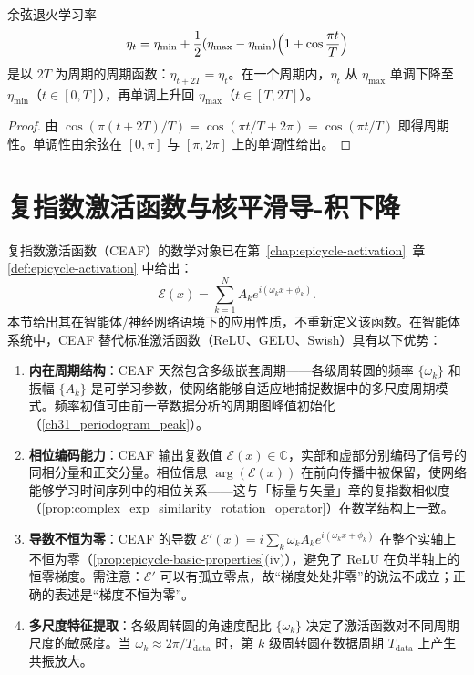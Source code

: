 \begin{proposition}[余弦退火学习率的周期结构]\label{prop:cosine_annealing_period_agent}
余弦退火学习率
\[
\eta_t = \eta_{\min} + \frac{1}{2}(\eta_{\max} - \eta_{\min})\Bigl(1 + \cos\frac{\pi t}{T}\Bigr)
\]
是以 $2T$ 为周期的周期函数：$\eta_{t+2T} = \eta_t$。在一个周期内，$\eta_t$ 从 $\eta_{\max}$ 单调下降至 $\eta_{\min}$（$t \in [0,T]$），再单调上升回 $\eta_{\max}$（$t \in [T,2T]$）。
\end{proposition}

\begin{proof}
由 $\cos(\pi(t+2T)/T) = \cos(\pi t/T + 2\pi) = \cos(\pi t/T)$ 即得周期性。单调性由余弦在 $[0,\pi]$ 与 $[\pi,2\pi]$ 上的单调性给出。
\end{proof}

\section{复指数激活函数与核平滑导-积下降}

\begin{definition}[复指数激活函数在智能体系统中的形式]\label{def:eaf_agent}
复指数激活函数（CEAF）的数学对象已在第~\ref{chap:epicycle-activation}~章 \cref{def:epicycle-activation} 中给出：
\[
\mathcal{E}(x)=\sum_{k=1}^{N}A_k e^{i(\omega_k x+\phi_k)}.
\]
本节给出其在智能体/神经网络语境下的应用性质，不重新定义该函数。在智能体系统中，CEAF 替代标准激活函数（ReLU、GELU、Swish）具有以下优势：
\begin{enumerate}[label=(\roman*)]
    \item \textbf{内在周期结构}：CEAF 天然包含多级嵌套周期——各级周转圆的频率 $\{\omega_k\}$ 和振幅 $\{A_k\}$ 是可学习参数，使网络能够自适应地捕捉数据中的多尺度周期模式。频率初值可由前一章数据分析的周期图峰值初始化（\cref{ch31_periodogram_peak}）。
    \item \textbf{相位编码能力}：CEAF 输出复数值 $\mathcal{E}(x) \in \mathbb{C}$，实部和虚部分别编码了信号的同相分量和正交分量。相位信息 $\arg(\mathcal{E}(x))$ 在前向传播中被保留，使网络能够学习时间序列中的相位关系——这与「标量与矢量」章的复指数相似度（\cref{prop:complex_exp_similarity_rotation_operator}）在数学结构上一致。
    \item \textbf{导数不恒为零}：CEAF 的导数 $\mathcal{E}'(x) = i\sum_k \omega_k A_k e^{i(\omega_k x + \phi_k)}$ 在整个实轴上不恒为零（\cref{prop:epicycle-basic-properties}(iv)），避免了 ReLU 在负半轴上的恒零梯度。需注意：$\mathcal{E}'$ 可以有孤立零点，故“梯度处处非零”的说法不成立；正确的表述是“梯度不恒为零”。
    \item \textbf{多尺度特征提取}：各级周转圆的角速度配比 $\{\omega_k\}$ 决定了激活函数对不同周期尺度的敏感度。当 $\omega_k \approx 2\pi/T_{\text{data}}$ 时，第 $k$ 级周转圆在数据周期 $T_{\text{data}}$ 上产生共振放大。
\end{enumerate}
\end{definition}

